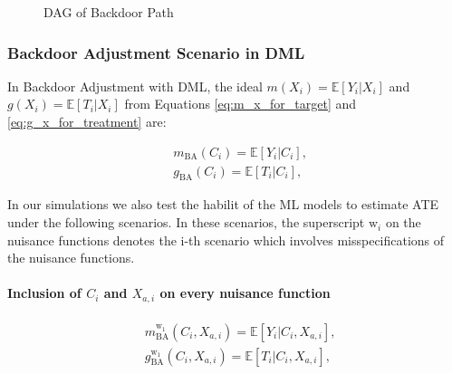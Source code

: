 \documentclass{article}
\numberwithin{equation}{section}
\begin{document}
\begin{figure}[H]
    \centering
    \caption{DAG of Backdoor Path}
    \label{fig:dag_backdoor_path}
\end{figure}

\subsubsection{Backdoor Adjustment Scenario in DML}

In Backdoor Adjustment with DML, the ideal $m(X_i) = \mathbb{E}[Y_i | X_i]$ and $g(X_i) = \mathbb{E}[T_i | X_i]$ from Equations \eqref{eq:m_x_for_target} and \eqref{eq:g_x_for_treatment} are:

\begin{align}
    & m_{\text{BA}}(C_i) = \mathbb{E}[Y_i | C_i],
    \label{eq:m_x_for_target_backdoor_adjustment}
    \\
    & g_{\text{BA}}(C_i) = \mathbb{E}[T_i | C_i],
    \label{eq:g_x_for_treatment_backdoor_adjustment}
\end{align}

In our simulations we also test the habilit of the ML models to estimate ATE under the following scenarios. In these scenarios, the superscript $\text{w}_i$ on the nuisance functions denotes the i-th scenario which involves misspecifications of the nuisance functions.

\paragraph{Inclusion of $C_i$ and $X_{a, i}$ on every nuisance function}

\begin{align}
    & m_{\text{BA}}^{\text{w}_1}(C_i, X_{a, i}) = \mathbb{E}[Y_i | C_i, X_{a, i}],
    \label{eq:m_x_for_target_backdoor_adjustment_wrong_1}
    \\
    & g_{\text{BA}}^{\text{w}_1}(C_i, X_{a, i}) = \mathbb{E}[T_i | C_i, X_{a, i}],
    \label{eq:g_x_for_treatment_backdoor_adjustment_wrong_1}
\end{align}
\end{document}
